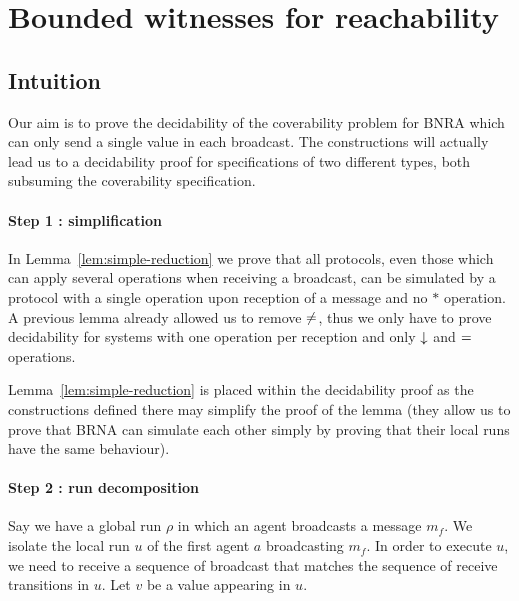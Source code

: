 \section{Bounded witnesses for reachability}

\ifintuition
\subsection{Intuition}

Our aim is to prove the decidability of the coverability problem for BNRA which can only send a single value in each broadcast. The constructions will actually lead us to a decidability proof for specifications of two different types, both subsuming the coverability specification.

\paragraph*{Step 1 : simplification} In Lemma~\ref{lem:simple-reduction} we prove that all protocols, even those which can apply several operations when receiving a broadcast, can be simulated by a protocol with a single operation upon reception of a message and no $*$ operation. A previous lemma already allowed us to remove ${\ne}$, thus we only have to prove decidability for systems with one operation per reception and only $\downarrow$ and ${=}$ operations.

Lemma~\ref{lem:simple-reduction} is placed within the decidability proof as the constructions defined there may simplify the proof of the lemma (they allow us to prove that BRNA can simulate each other simply by proving that their local runs have the same behaviour).

\paragraph*{Step 2 : run decomposition} Say we have a global run $\rho$ in which an agent broadcasts a message $m_f$. We isolate the local run $u$ of the first agent $a$ broadcasting $m_f$.
In order to execute $u$, we need to receive a sequence of broadcast that matches the sequence of receive transitions in $u$. Let $v$ be a value appearing in $u$.

